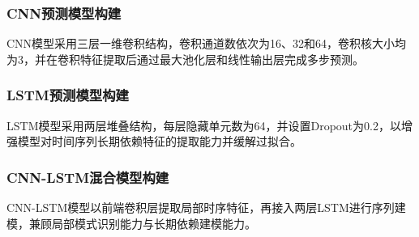 \subsubsection{CNN预测模型构建}
CNN模型采用三层一维卷积结构，卷积通道数依次为16、32和64，卷积核大小均为3，并在卷积特征提取后通过最大池化层和线性输出层完成多步预测。

\subsubsection{LSTM预测模型构建}
LSTM模型采用两层堆叠结构，每层隐藏单元数为64，并设置Dropout为0.2，以增强模型对时间序列长期依赖特征的提取能力并缓解过拟合。

\subsubsection{CNN-LSTM混合模型构建}
CNN-LSTM模型以前端卷积层提取局部时序特征，再接入两层LSTM进行序列建模，兼顾局部模式识别能力与长期依赖建模能力。

